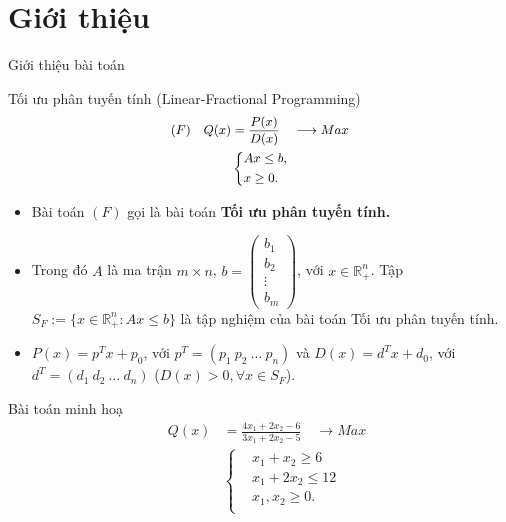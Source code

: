 \documentclass{beamer}
\begin{document}
\section{Giới thiệu}
\begin{frame}
   \center 
   \Huge Giới thiệu bài toán 
\end{frame}
\begin{frame}{Tối ưu phân tuyến tính (Linear-Fractional Programming)}
    \begin{equation} \small \label{F}
        \begin{split}
        (F) \quad Q(x) & = \frac{P(x)}{D(x)} \quad \longrightarrow Max \\
            & \left\{
            \begin{split}
            &Ax \leq  b, \\
            &x \geq 0. \\
            \end{split}
            \right.    
        \end{split}
    \end{equation}            
    \begin{itemize} \small
    \item Bài toán $(F)$ gọi là bài toán \textbf{Tối ưu phân tuyến tính.}
    \item Trong đó $A$ là ma trận $m\times n$, $b=\begin{pmatrix}
        b_1 \\
        b_2 \\
        \vdots \\
        b_m
        \end{pmatrix}$, với $x\in \mathbb{R}^n_+$. Tập $S_F:=\{x\in \mathbb{R}^n_+: Ax\leq b\}$ là tập nghiệm của bài toán Tối ưu phân tuyến tính. 
    \item $P(x)=p^Tx+p_0$, với $p^T = (p_1 \: p_2 \: \ldots \: p_n)$ và $D(x)=d^Tx+d_0$, với $d^T = (d_1 \: d_2 \: \ldots \: d_n)$ ($D(x)>0, \forall x \in S_F$).
    \end{itemize}
\end{frame}
\begin{frame}{Bài toán minh hoạ} \Large
    \begin{equation}
    \begin{split}
    \quad Q(x) & = \frac{4x_1+2x_2-6}{3x_1+2x_2-5} \quad \longrightarrow Max \\
        & \left\{
        \begin{split}
        & x_1 + x_2 \geq 6 \\
        & x_1 + 2x_2 \leq 12 \\
        &x_1, x_2 \geq 0. \\
        \end{split}\right.    
    \end{split}
    \end{equation}            
\end{frame}
\end{document}

